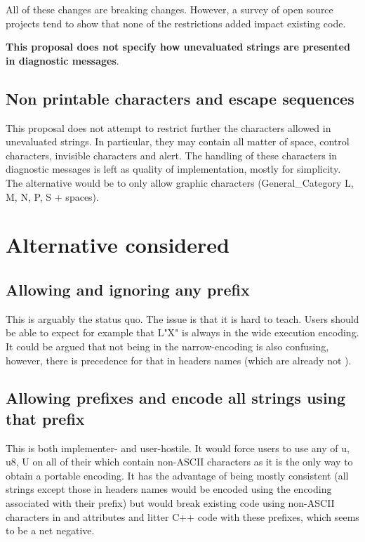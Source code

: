 \documentclass{wg21}
\begin{document}
All of these changes are breaking changes.
However, a survey of open source projects tend to show that none of the restrictions added
impact existing code.

\textbf{This proposal does not specify how unevaluated strings are presented in diagnostic messages}.

\subsection{Non printable characters and escape sequences}

This proposal does not attempt to restrict further the characters allowed in unevaluated strings.
In particular, they may contain all matter of space, control characters, invisible characters and alert.
The handling of these characters in diagnostic messages is left as quality of implementation, mostly
for simplicity. The alternative would be to only allow graphic characters (General_Category L, M, N, P, S + spaces).

\section{Alternative considered}

\subsection{Allowing and ignoring any prefix}

This is arguably the status quo.
The issue is that it is hard to teach. Users should be able to expect for example that L"X"
is always in the wide execution encoding.
It could be argued that  not being in the narrow-encoding is also confusing, however, there is precedence for that in headers names (which are already not ).

\subsection{Allowing prefixes and encode all strings using that prefix}

This is both implementer- and user-hostile. It would force users to use any of u, u8, U
on all of their  which contain non-ASCII characters as it is the only way to obtain a portable encoding.
It has the advantage of being mostly consistent (all strings except those in headers names would be encoded using the encoding associated with their prefix) but would break
existing code using non-ASCII characters in  and attributes and
litter C++ code with these prefixes, which seems to be a net negative.
\end{document}
